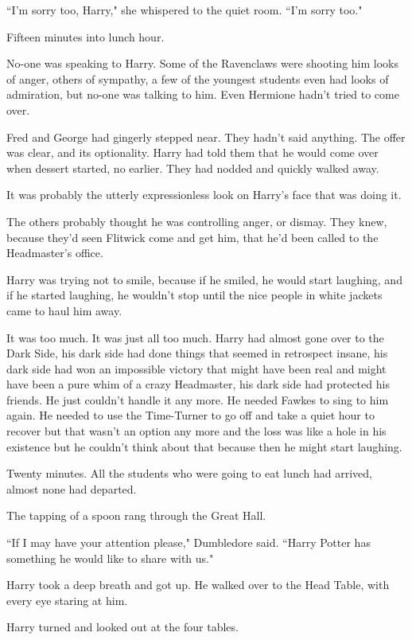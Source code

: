 ``I'm sorry too, Harry," she whispered to the quiet room. ``I'm sorry too."

\later

Fifteen minutes into lunch hour.

No-one was speaking to Harry. Some of the Ravenclaws were shooting him looks of anger, others of sympathy, a few of the youngest students even had looks of admiration, but no-one was talking to him. Even Hermione hadn't tried to come over.

Fred and George had gingerly stepped near. They hadn't said anything. The offer was clear, and its optionality. Harry had told them that he would come over when dessert started, no earlier. They had nodded and quickly walked away.

It was probably the utterly expressionless look on Harry's face that was doing it.

The others probably thought he was controlling anger, or dismay. They knew, because they'd seen Flitwick come and get him, that he'd been called to the Headmaster's office.

Harry was trying not to smile, because if he smiled, he would start laughing, and if he started laughing, he wouldn't stop until the nice people in white jackets came to haul him away.

It was too much. It was just all too much. Harry had almost gone over to the Dark Side, his dark side had done things that seemed in retrospect insane, his dark side had won an impossible victory that might have been real and might have been a pure whim of a crazy Headmaster, his dark side had protected his friends. He just couldn't handle it any more. He needed Fawkes to sing to him again. He needed to use the Time-Turner to go off and take a quiet hour to recover but that wasn't an option any more and the loss was like a hole in his existence but he couldn't think about that because then he might start laughing.

Twenty minutes. All the students who were going to eat lunch had arrived, almost none had departed.

The tapping of a spoon rang through the Great Hall.

``If I may have your attention please," Dumbledore said. ``Harry Potter has something he would like to share with us."

Harry took a deep breath and got up. He walked over to the Head Table, with every eye staring at him.

Harry turned and looked out at the four tables.

